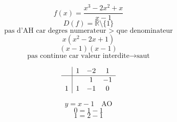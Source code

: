\documentclass{article}
\begin{document}
\[ f(x) = \frac{x^3 - 2x^2 + x}{x - 1} \]
\[ D(f) = \mathbb{R} \setminus \{1\} \]
\[ \text{pas d'AH car degres numerateur > que denominateur} \]
\[ x(x^2 - 2x + 1)\]
\[ (x - 1)(x - 1) \]
\[ \text{pas continue car valeur interdite} \rightarrow \text{saut} \]

\[
\begin{array}{c|ccc}
  & 1 & -2 & 1 \\
\hline
  &   & 1  & -1 \\
1 & 1 & -1 & 0 \\
\end{array}
\]

\[ y = x - 1 \quad \text{AO} \]
\[ 0 = 1 - 1 \]
\[ 1 = 2 - 1 \]
\end{document}
